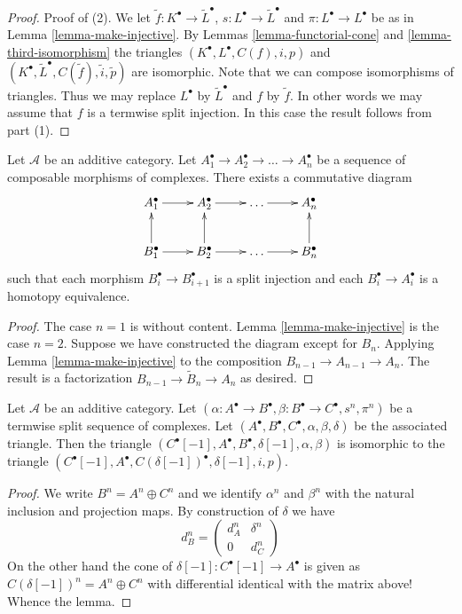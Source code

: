 \begin{proof}
\medskip\noindent
Proof of (2). We let $\tilde f : K^\bullet \to \tilde L^\bullet$,
$s : L^\bullet \to \tilde L^\bullet$
and $\pi : L^\bullet \to L^\bullet$ be as in
Lemma \ref{lemma-make-injective}. By Lemmas \ref{lemma-functorial-cone}
and \ref{lemma-third-isomorphism}
the triangles $(K^\bullet, L^\bullet, C(f), i, p)$ and
$(K^\bullet, \tilde L^\bullet, C(\tilde f), \tilde i, \tilde p)$
are isomorphic. Note that we can compose isomorphisms of
triangles. Thus we may replace $L^\bullet$ by
$\tilde L^\bullet$ and $f$ by $\tilde f$. In other words
we may assume that $f$ is a termwise split injection.
In this case the result follows from part (1).
\end{proof}


\begin{lemma}
\label{lemma-sequence-maps-split}
Let $\mathcal{A}$ be an additive category.
Let $A_1^\bullet \to A_2^\bullet \to \ldots \to A_n^\bullet$
be a sequence of composable morphisms of complexes.
There exists a commutative diagram
$$
\xymatrix{
A_1^\bullet \ar[r] &
A_2^\bullet \ar[r] &
\ldots \ar[r] &
A_n^\bullet \\
B_1^\bullet \ar[r] \ar[u] &
B_2^\bullet \ar[r] \ar[u] &
\ldots \ar[r] &
B_n^\bullet \ar[u]
}
$$
such that each morphism $B_i^\bullet \to B_{i + 1}^\bullet$
is a split injection and each $B_i^\bullet \to A_i^\bullet$
is a homotopy equivalence.
\end{lemma}

\begin{proof}
The case $n = 1$ is without content.
Lemma \ref{lemma-make-injective} is the case $n = 2$.
Suppose we have constructed the diagram
except for $B_n$. Applying Lemma \ref{lemma-make-injective} to
the composition $B_{n - 1} \to A_{n - 1} \to A_n$.
The result is a factorization $B_{n - 1} \to \tilde B_n \to A_n$
as desired.
\end{proof}


\begin{lemma}
\label{lemma-rotate-triangle}
Let $\mathcal{A}$ be an additive category. Let
$(\alpha : A^\bullet \to B^\bullet, \beta : B^\bullet \to C^\bullet, s^n,
\pi^n)$ be a termwise split sequence of complexes.
Let $(A^\bullet, B^\bullet, C^\bullet, \alpha, \beta, \delta)$
be the associated triangle.
Then the triangle
$(C^\bullet[-1], A^\bullet, B^\bullet, \delta[-1], \alpha, \beta)$
is isomorphic to the triangle
$(C^\bullet[-1], A^\bullet, C(\delta[-1])^\bullet, \delta[-1], i, p)$.
\end{lemma}

\begin{proof}
We write $B^n = A^n \oplus C^n$ and we identify $\alpha^n$ and $\beta^n$
with the natural inclusion and projection maps. By construction of $\delta$ we
have
$$
d_B^n =
\left(
\begin{matrix}
d_A^n & \delta^n \\
0 & d_C^n
\end{matrix}
\right)
$$
On the other hand the cone of $\delta[-1] : C^\bullet[-1] \to A^\bullet$
is given as $C(\delta[-1])^n = A^n \oplus C^n$ with differential identical
with the matrix above! Whence the lemma.
\end{proof}

